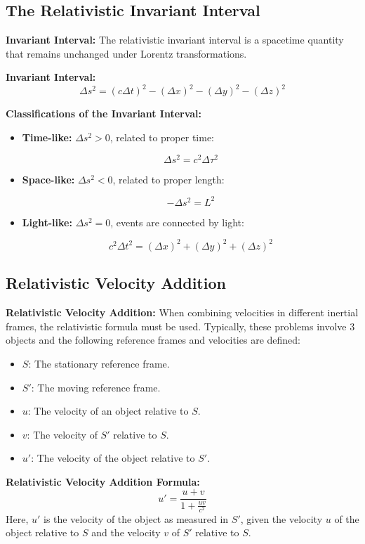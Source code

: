 \documentclass{article}
\newcommand{\eqbox}[1]{\begin{tcolorbox}[colback=gray!10] #1 \end{tcolorbox}}
\newcommand{\conceptbox}[1]{\begin{tcolorbox}[colback=blue!10] #1 \end{tcolorbox}}
\begin{document}
\subsection{The Relativistic Invariant Interval}
\conceptbox{
\textbf{Invariant Interval:}
The relativistic invariant interval is a spacetime quantity that remains unchanged under Lorentz transformations.
}
\eqbox{
\textbf{Invariant Interval:}
\[
\Delta s^2 = (c\Delta t)^2 - (\Delta x)^2 - (\Delta y)^2 - (\Delta z)^2
\]}
\conceptbox{
\textbf{Classifications of the Invariant Interval:}
\begin{itemize}
    \item \textbf{Time-like:} \( \Delta s^2 > 0 \), related to proper time:
    \eqbox{
    \[
    \Delta s^2 = c^2 \Delta \tau^2
    \]
    }
    \item \textbf{Space-like:} \( \Delta s^2 < 0 \), related to proper length:
    \eqbox{
    \[
    -\Delta s^2 = L^2
    \]
    }
    \item \textbf{Light-like:} \( \Delta s^2 = 0 \), events are connected by light:
    \eqbox{
    \[
    c^2\Delta t^2 = (\Delta x)^2 + (\Delta y)^2 + (\Delta z)^2
    \]
    }
\end{itemize}
}

\subsection{Relativistic Velocity Addition}
\conceptbox{
\textbf{Relativistic Velocity Addition:}
When combining velocities in different inertial frames, the relativistic formula must be used. Typically, these problems involve 3 objects and the following reference frames and velocities are defined:
\begin{itemize}
    \item \( S \): The stationary reference frame.
    \item \( S' \): The moving reference frame.
    \item \( u \): The velocity of an object relative to \( S \).
    \item \( v \): The velocity of \( S' \) relative to \( S \).
    \item \( u' \): The velocity of the object relative to \( S' \).
\end{itemize}
\eqbox{
\textbf{Relativistic Velocity Addition Formula:}
\[
u' = \frac{u + v}{1 + \frac{uv}{c^2}}
\]
Here, \( u' \) is the velocity of the object as measured in \( S' \), given the velocity \( u \) of the object relative to \( S \) and the velocity \( v \) of \( S' \) relative to \( S \).
}
}
\end{document}
